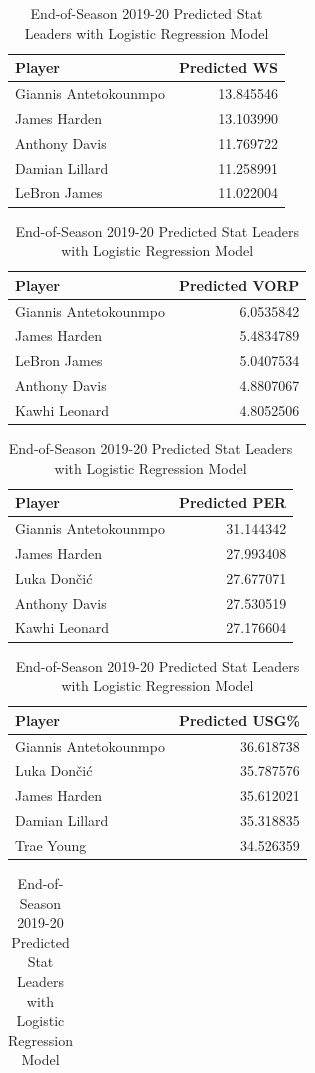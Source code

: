 \documentclass[]{article}
\begin{document}
\begin{table}
\caption{End-of-Season 2019-20 Predicted Stat Leaders with Logistic Regression Model}

\centering
\begin{tabular}[t]{l|r}
\hline
Player & Predicted WS\\
\hline
Giannis Antetokounmpo & 13.845546\\
\hline
James Harden & 13.103990\\
\hline
Anthony Davis & 11.769722\\
\hline
Damian Lillard & 11.258991\\
\hline
LeBron James & 11.022004\\
\hline
\end{tabular}
\centering
\begin{tabular}[t]{l|r}
\hline
Player & Predicted VORP\\
\hline
Giannis Antetokounmpo & 6.0535842\\
\hline
James Harden & 5.4834789\\
\hline
LeBron James & 5.0407534\\
\hline
Anthony Davis & 4.8807067\\
\hline
Kawhi Leonard & 4.8052506\\
\hline
\end{tabular}
\centering
\begin{tabular}[t]{l|r}
\hline
Player & Predicted PER\\
\hline
Giannis Antetokounmpo & 31.144342\\
\hline
James Harden & 27.993408\\
\hline
Luka Dončić & 27.677071\\
\hline
Anthony Davis & 27.530519\\
\hline
Kawhi Leonard & 27.176604\\
\hline
\end{tabular}
\centering
\begin{tabular}[t]{l|r}
\hline
Player & Predicted USG\%\\
\hline
Giannis Antetokounmpo & 36.618738\\
\hline
Luka Dončić & 35.787576\\
\hline
James Harden & 35.612021\\
\hline
Damian Lillard & 35.318835\\
\hline
Trae Young & 34.526359\\
\hline
\end{tabular}
\centering
\begin{tabular}[t]{l|r}

\end{tabular}
\end{table}
\end{document}
